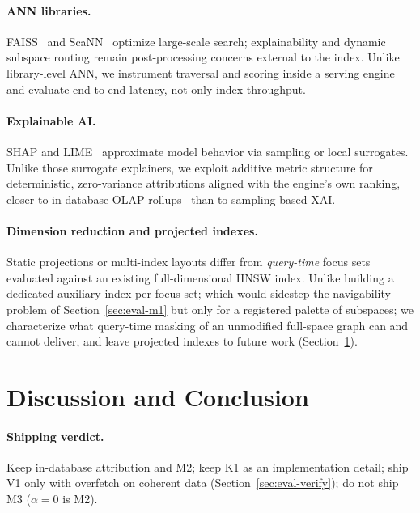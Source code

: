 \documentclass[sigconf,review,balance=false]{acmart}
\begin{document}
\paragraph{ANN libraries.} FAISS~\cite{johnson2019faiss} and
ScaNN~\cite{guo2020scann} optimize large-scale search; explainability and
dynamic subspace routing remain post-processing concerns external to the
index.
Unlike library-level ANN, we instrument traversal and scoring inside a
serving engine and evaluate end-to-end latency, not only index throughput.

\paragraph{Explainable AI.} SHAP and LIME~\cite{lundberg2017shap,ribeiro2016lime}
approximate model behavior via sampling or local surrogates.
Unlike those surrogate explainers, we exploit additive metric structure for
deterministic, zero-variance attributions aligned with the engine's own ranking, 
closer to in-database OLAP rollups~\cite{gray1998data} than to sampling-based
XAI.

\paragraph{Dimension reduction and projected indexes.} Static projections or
multi-index layouts differ from \emph{query-time} focus sets evaluated against
an existing full-dimensional HNSW index.
Unlike building a dedicated auxiliary index per focus set; which would sidestep
the navigability problem of Section~\ref{sec:eval-m1} but only for a registered
palette of subspaces; we characterize what query-time masking of an unmodified
full-space graph can and cannot deliver, and leave projected indexes to future
work (Section~\ref{sec:discussion}).

\section{Discussion and Conclusion}
\label{sec:discussion}

\paragraph{Shipping verdict.} Keep in-database attribution and M2; keep K1 as
an implementation detail; ship V1 only with overfetch on coherent data
(Section~\ref{sec:eval-verify}); do not ship M3 ($\alpha{=}0$ is M2).
\end{document}

